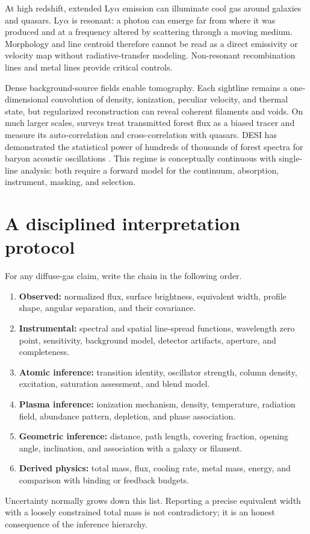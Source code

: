 At high redshift, extended Ly$\alpha$ emission can illuminate cool gas around
galaxies and quasars. Ly$\alpha$ is resonant: a photon can emerge far from
where it was produced and at a frequency altered by scattering through a
moving medium. Morphology and line centroid therefore cannot be read as a
direct emissivity or velocity map without radiative-transfer modeling.
Non-resonant recombination lines and metal lines provide critical controls.

Dense background-source fields enable tomography. Each sightline remains a
one-dimensional convolution of density, ionization, peculiar velocity, and
thermal state, but regularized reconstruction can reveal coherent filaments
and voids. On much larger scales, surveys treat transmitted forest flux as a
biased tracer and measure its auto-correlation and cross-correlation with
quasars. DESI has demonstrated the statistical power of hundreds of
thousands of forest spectra for baryon acoustic oscillations
\citep{DESI2025LyA}. This regime is conceptually continuous with single-line
analysis: both require a forward model for the continuum, absorption,
instrument, masking, and selection.

\section{A disciplined interpretation protocol}

For any diffuse-gas claim, write the chain in the following order.
\begin{enumerate}
  \item \textbf{Observed:} normalized flux, surface brightness, equivalent
  width, profile shape, angular separation, and their covariance.
  \item \textbf{Instrumental:} spectral and spatial line-spread functions,
  wavelength zero point, sensitivity, background model, detector artifacts,
  aperture, and completeness.
  \item \textbf{Atomic inference:} transition identity, oscillator strength,
  column density, excitation, saturation assessment, and blend model.
  \item \textbf{Plasma inference:} ionization mechanism, density,
  temperature, radiation field, abundance pattern, depletion, and phase
  association.
  \item \textbf{Geometric inference:} distance, path length, covering
  fraction, opening angle, inclination, and association with a galaxy or
  filament.
  \item \textbf{Derived physics:} total mass, flux, cooling rate, metal mass,
  energy, and comparison with binding or feedback budgets.
\end{enumerate}
Uncertainty normally grows down this list. Reporting a precise equivalent
width with a loosely constrained total mass is not contradictory; it is an
honest consequence of the inference hierarchy.

